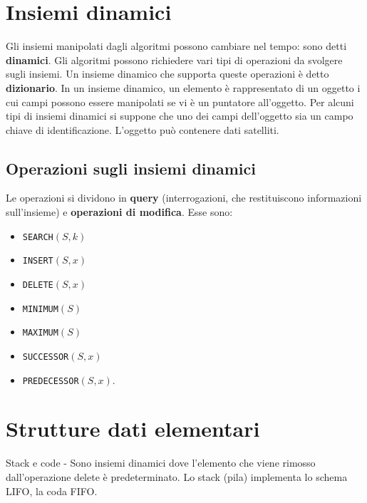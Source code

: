 \documentclass[11pt,a4paper]{article}
\begin{document}
\section{Insiemi dinamici}
Gli insiemi manipolati dagli algoritmi possono cambiare nel tempo: sono detti \textbf{dinamici}.
Gli algoritmi possono richiedere vari tipi di operazioni da svolgere sugli insiemi. Un insieme dinamico che
supporta queste operazioni è detto \textbf{dizionario}.
In un insieme dinamico, un elemento è rappresentato di un oggetto i cui campi possono essere manipolati
se vi è un puntatore all’oggetto.
Per alcuni tipi di insiemi dinamici si suppone che uno dei campi dell’oggetto sia un campo chiave di
identificazione. L’oggetto può contenere dati satelliti.

\subsection{Operazioni sugli insiemi dinamici}
Le operazioni si dividono in \textbf{query} (interrogazioni, che restituiscono informazioni sull’insieme) e \textbf{operazioni di modifica}.
Esse sono:
\begin{itemize}[leftmargin=*, noitemsep]
  \item \texttt{SEARCH}$(S, k)$
  \item \texttt{INSERT}$(S, x)$
  \item \texttt{DELETE}$(S, x)$
  \item \texttt{MINIMUM}$(S)$
  \item \texttt{MAXIMUM}$(S)$
  \item \texttt{SUCCESSOR}$(S, x)$
  \item \texttt{PREDECESSOR}$(S, x)$.
\end{itemize}

\section{Strutture dati elementari}
Stack e code - Sono insiemi dinamici dove l’elemento che viene rimosso dall’operazione delete è
predeterminato. Lo stack (pila) implementa lo schema LIFO, la coda FIFO.
\end{document}
